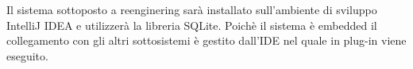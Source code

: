 



Il sistema sottoposto a reenginering sarà installato sull'ambiente di sviluppo IntelliJ IDEA e utilizzerà la libreria SQLite. Poichè il sistema è embedded il collegamento con gli altri sottosistemi è gestito dall'IDE nel quale in plug-in viene eseguito.